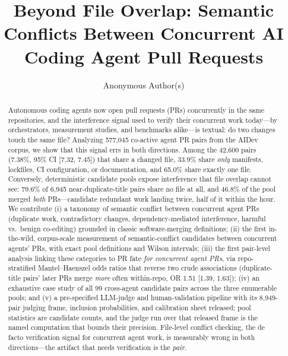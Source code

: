 \documentclass{article}
\title{Beyond File Overlap: Semantic Conflicts Between Concurrent AI Coding Agent Pull Requests}
\author{Anonymous Author(s)}
\date{}
\begin{document}
\maketitle

\begin{abstract}
Autonomous coding agents now open pull requests (PRs) concurrently in the same repositories, and the interference signal used to verify their concurrent work today---by orchestrators, measurement studies, and benchmarks alike---is textual: do two changes touch the same file? Analyzing 577{,}045 co-active agent PR pairs from the AIDev corpus, we show that this signal errs in both directions. %
Among the 42{,}600 pairs (7.38\%, 95\% CI [7.32, 7.45]) that share a changed file, 33.9\% share \emph{only} manifests, lockfiles, CI configuration, or documentation, and 65.0\% share exactly one file. %
Conversely, deterministic candidate pools expose interference that file overlap cannot see: 79.6\% of 6{,}945 near-duplicate-title pairs share no file at all, and 46.8\% of the pool merged \emph{both} PRs---candidate redundant work landing twice, half of it within the hour. %
We contribute (i) a taxonomy of semantic conflict between concurrent agent PRs (duplicate work, contradictory changes, dependency-mediated interference, harmful vs.\ benign co-editing) grounded in classic software-merging definitions; (ii) the first in-the-wild, corpus-scale measurement of semantic-conflict candidates between concurrent agents' PRs, with exact pool definitions and Wilson intervals; (iii) the first pair-level analysis linking these categories to PR fate \emph{for concurrent agent PRs}, via repo-stratified Mantel--Haenszel odds ratios that reverse two crude associations (duplicate-title pairs' later PRs merge \emph{more} often within-repo, OR 1.51 [1.39, 1.63]); %
(iv) an exhaustive case study of all 99 cross-agent candidate pairs across the three enumerable pools; and (v) a pre-specified LLM-judge and human-validation pipeline with its 8{,}949-pair judging frame, inclusion probabilities, and calibration sheet released; pool statistics are candidate counts, and the judge run over that released frame is the named computation that bounds their precision. File-level conflict checking, the de facto verification signal for concurrent agent work, is measurably wrong in both directions---the artifact that needs verification is the \emph{pair}.
\end{abstract}
\end{document}
